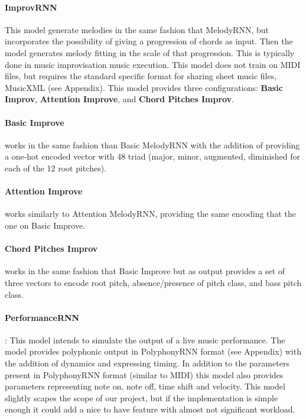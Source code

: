 \paragraph{ImprovRNN} This model generate melodies in the same fashion that MelodyRNN, but
incorporates the possibility of giving a progression of chords as input. Then the model
generates melody fitting in the scale of that progression. This is typically done in music
improvisation music execution. This model does not train on MIDI files, but requires the
standard specific format for sharing sheet music files, MusicXML (see Appendix). This
model provides three configurations: \textbf{Basic Improv}, \textbf{Attention Improve},
and \textbf{Chord Pitches Improv}.

\paragraph{Basic Improve} works in the same fashion than Basic MelodyRNN with the addition of
providing a one-hot encoded vector with 48 triad (major, minor, augmented, diminished for
each of the 12 root pitches).

\paragraph{Attention Improve} works similarly to Attention MelodyRNN, providing the same
encoding that the one on Basic Improve.

\paragraph{Chord Pitches Improv} works in the same fashion that Basic Improve but as
output provides a set of three vectors to encode root pitch, absence/presence of pitch
class, and bass pitch class.

\paragraph{PerformanceRNN}: This model intends to simulate the output of a live music
performance. The model provides polyphonic output in PolyphonyRNN format (see Appendix)
with the addition of dynamics and expressing timing. In addition to the parameters present
in PolyphonyRNN format (similar to MIDI) this model also provides parameters representing
note on, note off, time shift and velocity. This model slightly scapes the scope of our
project, but if the implementation is simple enough it could add a nice to have feature
with almost not significant workload.

